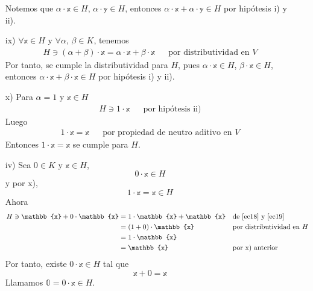 \begin{theorem}
\begin{enumerate}
        Notemos que $\alpha \cdot \mathbb{x} \in H$, $\alpha \cdot \mathbb{y} \in H$, entonces $\alpha \cdot \mathbb{x} + \alpha \cdot \mathbb{y} \in H$ por hipótesis i) y ii).
        \item[ix)] $\forall \mathbb{x}\in H$ y $\forall \alpha$, $\beta \in K$, tenemos
        \begin{align*}
            H \ni (\alpha + \beta) \cdot \mathbb{x} = \alpha \cdot \mathbb{x} + \beta \cdot \mathbb{x} && \text{por distributividad en $V$}
        \end{align*}
        Por tanto, se cumple la distributividad para $H$, pues $\alpha \cdot \mathbb{x} \in H$, $\beta \cdot \mathbb{x} \in H$, entonces $\alpha \cdot \mathbb{x} + \beta \cdot \mathbb{x} \in H$ por hipótesis i) y ii).
        \item[x)] Para $\alpha = 1$ y $\mathbb{x} \in H$
        \begin{align*}
            H \ni 1 \cdot \mathbb{x} && \text{por hipótesis ii)}
        \end{align*}
        Luego
        \begin{align*}
            1 \cdot \mathbb{x} = \mathbb{x} && \text{por propiedad de neutro aditivo en $V$}
        \end{align*}
        Entonces $1 \cdot \mathbb{x} = \mathbb{x}$  se cumple para $H$.
        \item[iv)] Sea $0 \in K$ y $\mathbb{x} \in H$,
        \begin{equation}
            0 \cdot \mathbb{x} \in H \label{ec18}
        \end{equation}
        y por x),
        \begin{equation}
            1 \cdot \mathbb{x} = \mathbb{x} \in H \label{ec19}
        \end{equation}
        Ahora
        \begin{align*}
            H \ni \mathbb{x} + 0 \cdot \mathbb{x} & = 1 \cdot \mathbb{x} + \mathbb{x} && \text{de \eqref{ec18} y \eqref{ec19}} \\
            & = (1 + 0) \cdot \mathbb{x} && \text{por distributividad en $H$} \\
            & = 1 \cdot \mathbb{x} \\
            & = \mathbb{x} && \text{por x) anterior} 
        \end{align*}
        Por tanto, existe $0 \cdot \mathbb{x} \in H$ tal que
        $$\mathbb{x} + 0 = \mathbb{x}$$
        Llamamos $\mathbb{0} = 0 \cdot \mathbb{x} \in H$.


\end{enumerate}
\end{theorem}
